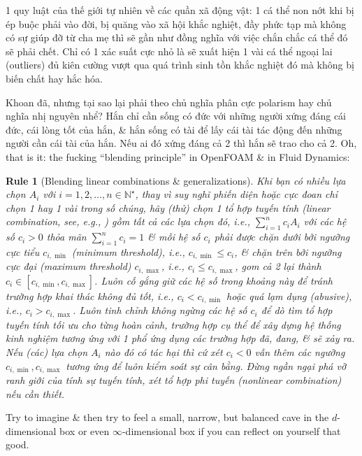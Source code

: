 \documentclass[12pt,oneside]{book}
\newtheorem{Rule}{Rule}
\begin{document}
1 quy luật của thế giới tự nhiên về các quần xã động vật: 1 cá thể non nớt khi bị ép buộc phải vào đời, bị quăng vào xã hội khắc nghiệt, đầy phức tạp mà không có sự giúp đỡ từ cha mẹ thì sẽ gần như đồng nghĩa với việc chắn chắc cá thể đó sẽ phải chết. Chỉ có 1 xác suất cực nhỏ là sẽ xuất hiện 1 vài cá thể ngoại lai (outliers) đủ kiên cường vượt qua quá trình sinh tồn khắc nghiệt đó mà không bị biến chất hay hắc hóa.

Khoan đã, nhưng tại sao lại phải theo chủ nghĩa phân cực polarism hay chủ nghĩa nhị nguyên nhể? Hắn chỉ cần sống có đức với những người xứng đáng cái đức, cái lòng tốt của hắn, \& hắn sống có tài để lấy cái tài tác động đến những người cần cái tài của hắn. Nếu ai đó xứng đáng cả 2 thì hắn sẽ trao cho cả 2. Oh, that is it: the fucking ``blending principle'' in OpenFOAM \& in Fluid Dynamics:

\begin{Rule}[Blending linear combinations \& generalizations]
	Khi bạn có nhiều lựa chọn $A_i$ với $i = 1,2,\ldots,n\in\mathbb{N}^\star$, thay vì suy nghĩ phiến diện hoặc cực đoan chỉ chọn 1 hay 1 vài trong số chúng, hãy (thử) chọn 1 tổ hợp tuyến tính (linear combination, see, e.g., {\rm\cite{Hung_linear_algebra,Trefethen_Bau1997,Trefethen_Bau2022}}) gồm tất cả các lựa chọn đó, i.e., $\sum_{i = 1}^n c_iA_i$ với các hệ số $c_i > 0$ thỏa mãn $\sum_{i = 1}^n c_i = 1$ \& mỗi hệ số $c_i$ phải được chặn dưới bởi ngưỡng cực tiểu $c_{i,\min}$ (minimum threshold), i.e., $c_{i,\min}\le c_i$, \& chặn trên bởi ngưỡng cực đại (maximum threshold) $c_{i,\max}$, i.e., $c_i\le c_{i,\max}$, gom cả 2 lại thành $c_i\in[c_{i,\min},c_{i,\max}]$. Luôn cố gắng giữ các hệ số trong khoảng này để tránh trường hợp khai thác không đủ tốt, i.e., $c_i < c_{i,\min}$ hoặc quá lạm dụng (abusive), i.e., $c_i > c_{i,\max}$. Luôn tinh chỉnh không ngừng các hệ số $c_i$ để dò tìm tổ hợp tuyến tính tối ưu cho từng hoàn cảnh, trường hợp cụ thể để xây dựng hệ thống kinh nghiệm tương ứng với 1 phổ ứng dụng các trường hợp đã, đang, \& sẽ xảy ra. Nếu (các) lựa chọn $A_i$ nào đó có tác hại thì cứ xét $c_i < 0$ vẫn thêm các ngưỡng $c_{i,\min},c_{i,\max}$ tương ứng để luôn kiểm soát sự cân bằng. Đừng ngần ngại phá vỡ ranh giới của tính sự tuyến tính, xét tổ hợp phi tuyến (nonlinear combination) nếu cần thiết.
\end{Rule}
Try to imagine \& then try to feel a small, narrow, but balanced cave in the $d$-dimensional box or even $\infty$-dimensional box if you can reflect on yourself that good.
\end{document}
